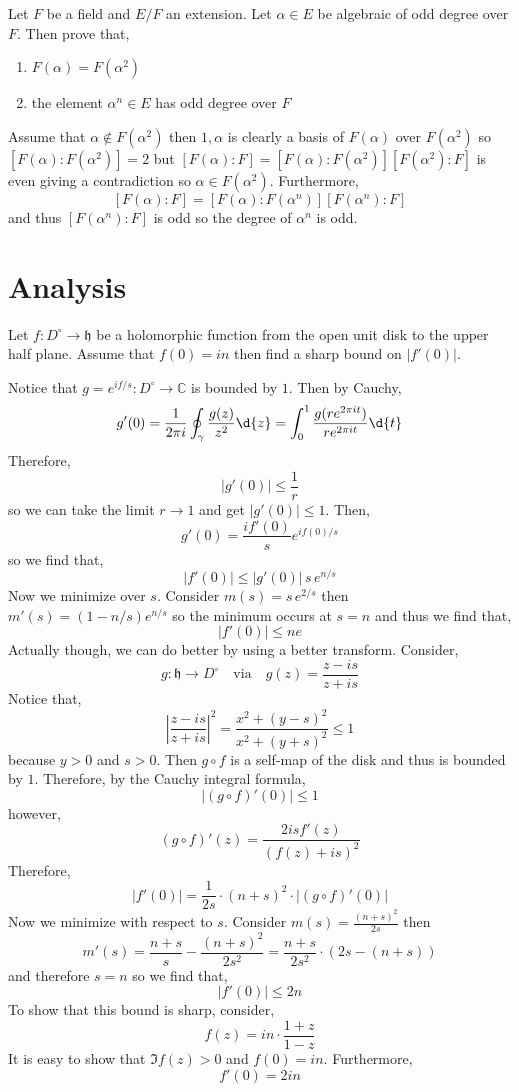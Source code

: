 \documentclass[12pt]{article}
\begin{document}
\begin{exercise}
Let $F$ be a field and $E / F$ an extension. Let $\alpha \in E$ be algebraic of odd degree over $F$. Then prove that,
\begin{enumerate}
\item $F(\alpha) = F(\alpha^2)$
\item the element $\alpha^n \in E$ has odd degree over $F$
\end{enumerate}
\end{exercise}

Assume that $\alpha \notin F(\alpha^2)$ then $1, \alpha$ is clearly a basis of $F(\alpha)$ over $F(\alpha^2)$ so $[F(\alpha) : F(\alpha^2)] = 2$ but $[F(\alpha) : F] = [F(\alpha) : F(\alpha^2)] [F(\alpha^2) : F]$ is even giving a contradiction so $\alpha \in F(\alpha^2)$. Furthermore, 
\[ [F(\alpha) : F] = [F(\alpha) : F(\alpha^n)] [F(\alpha^n) : F] \]
and thus $[F(\alpha^n) : F]$ is odd so the degree of $\alpha^n$ is odd.

\section{Analysis}

\begin{exercise}
Let $f : D^\circ \to \mathfrak{h}$ be a holomorphic function from the open unit disk to the upper half plane. Assume that $f(0) = i n$ then find a sharp bound on $|f'(0)|$.
\end{exercise}

Notice that $g = e^{if/s} : D^\circ \to \mathbb{C}$ is bounded by $1$. Then by Cauchy,
\[ g'(0) = \frac{1}{2\pi i} \oint_\gamma \frac{g(z)}{z^2} \d{z} = \int_0^1 \frac{g(r e^{2\pi i t})}{r e^{2 \pi i t}} \d{t} \]
Therefore,
\[ |g'(0)| \le \frac{1}{r} \]
so we can take the limit $r \to 1$ and get $|g'(0)| \le 1$. Then,
\[ g'(0) = \frac{i f'(0)}{s} e^{i f(0)/s} \]
so we find that,
\[ |f'(0)| \le |g'(0)| \, s \, e^{n/s} \] 
Now we minimize over $s$. Consider $m(s) = s \, e^{2/s}$ then $m'(s) = (1 - n / s) e^{n/s}$ so the minimum occurs at $s = n$ and thus we find that,
\[ |f'(0)| \le n e \]
Actually though, we can do better by using a better transform. Consider,
\[ g : \mathfrak{h} \to D^\circ \quad \text{via} \quad g(z) = \frac{z - i s}{z + i s} \]
Notice that,
\[ \left| \frac{z - i s}{z + i s} \right|^2 = \frac{x^2 + (y - s)^2}{x^2 + (y + s)^2} \le 1 \]
because $y > 0$ and $s > 0$.
Then $g \circ f$ is a self-map of the disk and thus is bounded by $1$.  Therefore, by the Cauchy integral formula,
\[ |(g \circ f)'(0)| \le 1 \]
however,
\[ (g \circ f)'(z) = \frac{2 i s f'(z)}{(f(z) + i s)^2} \]
Therefore, 
\[ |f'(0)| = \frac{1}{2s} \cdot (n + s)^2 \cdot |(g \circ f)'(0)| \] 
Now we minimize with respect to $s$. Consider $m(s) = \frac{(n + s)^2}{2 s}$ then
\[ m'(s) = \frac{n + s}{s} - \frac{(n + s)^2}{2s^2} = \frac{n + s}{2 s^2} \cdot \left( 2 s - (n + s) \right)  \]
and therefore $s = n$ so we find that,
\[ |f'(0)| \le 2 n \]
To show that this bound is sharp, consider,
\[ f(z) = i n \cdot \frac{1 + z}{1 - z} \]
It is easy to show that $\Im{f(z)} > 0$ and $f(0) = i n$. Furthermore,
\[ f'(0) = 2 i n \]
\end{document}
